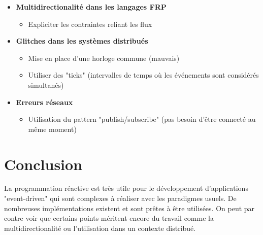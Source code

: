 \documentclass[10pt,final]{IEEEtran}
\begin{document}
\begin{itemize}
    \item \textbf{Multidirectionalité dans les langages FRP}
        \begin{itemize}
            \item Expliciter les contraintes reliant les flux 
        \end{itemize}
    \item \textbf{Glitches dans les systèmes distribués}
        \begin{itemize}
            \item Mise en place d'une horloge commune (mauvais)
            \item Utiliser des "ticks" (intervalles de temps où les événements sont considérés simultanés)
        \end{itemize}
    \item \textbf{Erreurs réseaux}
        \begin{itemize}
            \item Utilisation du pattern "publish/subscribe" (pas besoin d'être connecté au même moment)
        \end{itemize}
\end{itemize}

\section{Conclusion}

La programmation réactive est très utile pour le développement d'applications "event-driven" qui sont complexes à réaliser avec les paradigmes usuels. De nombreuses implémentations existent et sont prêtes à être utilisées. On peut par contre voir que certains points méritent encore du travail comme la multidirectionalité ou l'utilisation dans un contexte distribué.
\end{document}
